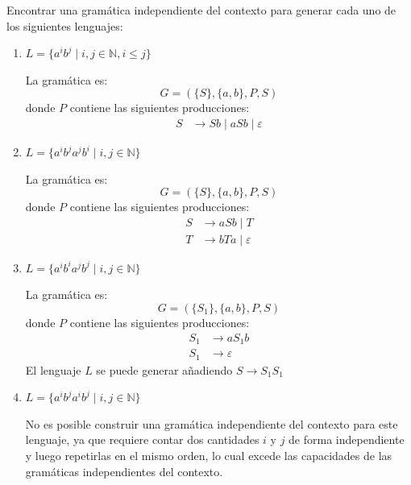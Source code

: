 \documentclass[12pt]{book} %
\begin{document}
\begin{ejercicioresuelto}
Encontrar una gramática independiente del contexto para generar cada uno de los siguientes lenguajes:

\begin{enumerate}
    \item \( L = \{a^i b^j \mid i, j \in \mathbb{N}, i \leq j\} \)

    \begin{solucion}
    La gramática es:
    \[
    G = (\{S\}, \{a, b\}, P, S)
    \]
    donde \( P \) contiene las siguientes producciones:
    \[
    \begin{aligned}
        S &\to Sb \mid aSb \mid \varepsilon
    \end{aligned}
    \]
    \end{solucion}

    \item \( L = \{a^i b^j a^j b^i \mid i, j \in \mathbb{N}\} \)

    \begin{solucion}
    La gramática es:
    \[
    G = (\{S\}, \{a, b\}, P, S)
    \]
    donde \( P \) contiene las siguientes producciones:
    \[
    \begin{aligned}
        S &\to aSb \mid T \\
        T &\to bTa \mid \varepsilon
    \end{aligned}
    \]
    \end{solucion}

    \item \( L = \{a^i b^i a^j b^j \mid i, j \in \mathbb{N}\} \)

    \begin{solucion}
    La gramática es:
    \[
    G = (\{S_1\}, \{a, b\}, P, S)
    \]
    donde \( P \) contiene las siguientes producciones:
    \[
    \begin{aligned}
        S_1 &\to aS_1b \\
        S_1 &\to \varepsilon
    \end{aligned}
    \]
    El lenguaje $L$ se puede generar añadiendo $S \rightarrow S_1S_1$
    \end{solucion}

    \item \( L = \{a^i b^j a^i b^j \mid i, j \in \mathbb{N}\} \)

    \begin{solucion}
    No es posible construir una gramática independiente del contexto para este lenguaje, ya que requiere contar dos cantidades \( i \) y \( j \) de forma independiente y luego repetirlas en el mismo orden, lo cual excede las capacidades de las gramáticas independientes del contexto.
    \end{solucion}


\end{enumerate}
\end{ejercicioresuelto}
\end{document}
